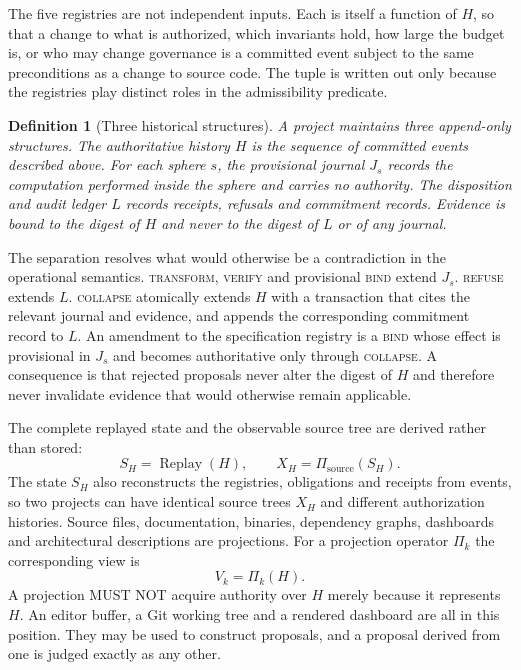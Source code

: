 \documentclass[11pt]{article}
\newtheorem{definition}{Definition}
\theoremstyle{remark}
\newcommand{\Replay}{\operatorname{Replay}}
\newcommand{\REFUSE}{\textsc{refuse}}
\newcommand{\BIND}{\textsc{bind}}
\newcommand{\TRANSFORM}{\textsc{transform}}
\newcommand{\VERIFY}{\textsc{verify}}
\newcommand{\COLLAPSE}{\textsc{collapse}}
\begin{document}
The five registries are not independent inputs. Each is itself a function of $H$, so that a change to what is authorized, which invariants hold, how large the budget is, or who may change governance is a committed event subject to the same preconditions as a change to source code. The tuple is written out only because the registries play distinct roles in the admissibility predicate.

\begin{definition}[Three historical structures]
A project maintains three append-only structures. The \emph{authoritative history} $H$ is the sequence of committed events described above. For each sphere $s$, the \emph{provisional journal} $J_s$ records the computation performed inside the sphere and carries no authority. The \emph{disposition and audit ledger} $L$ records receipts, refusals and commitment records. Evidence is bound to the digest of $H$ and never to the digest of $L$ or of any journal.
\end{definition}

The separation resolves what would otherwise be a contradiction in the operational semantics. \TRANSFORM, \VERIFY{} and provisional \BIND{} extend $J_s$. \REFUSE{} extends $L$. \COLLAPSE{} atomically extends $H$ with a transaction that cites the relevant journal and evidence, and appends the corresponding commitment record to $L$. An amendment to the specification registry is a \BIND{} whose effect is provisional in $J_s$ and becomes authoritative only through \COLLAPSE. A consequence is that rejected proposals never alter the digest of $H$ and therefore never invalidate evidence that would otherwise remain applicable.

The complete replayed state and the observable source tree are derived rather than stored:
\[
S_H=\Replay(H),\qquad X_H=\Pi_{\mathrm{source}}(S_H).
\]
The state $S_H$ also reconstructs the registries, obligations and receipts from events, so two projects can have identical source trees $X_H$ and different authorization histories.
Source files, documentation, binaries, dependency graphs, dashboards and architectural descriptions are projections. For a projection operator $\Pi_k$ the corresponding view is
\[
V_k=\Pi_k(H).
\]
A projection MUST NOT acquire authority over $H$ merely because it represents $H$. An editor buffer, a Git working tree and a rendered dashboard are all in this position. They may be used to construct proposals, and a proposal derived from one is judged exactly as any other.
\end{document}
